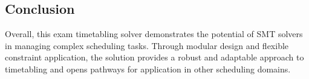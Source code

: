 \documentclass[a4paper]{article}
\begin{document}
    \subsection{Conclusion}
    Overall, this exam timetabling solver demonstrates the potential of SMT solvers in managing complex scheduling tasks. Through modular design and flexible constraint application, the solution provides a robust and adaptable approach to timetabling and opens pathways for application in other scheduling domains.
    

     
    
\end{document}
